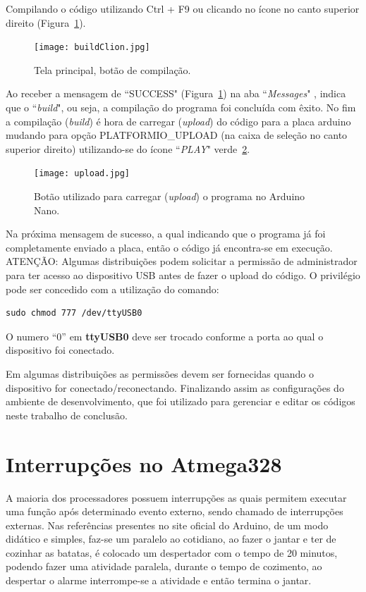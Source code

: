 \documentclass[a4paper,12pt,portuguese]{ufms-cpcx}
\begin{document}
Compilando o código utilizando Ctrl + F9 ou clicando no ícone no canto superior direito (Figura~\ref{fig:telarun1}).
\begin{figure}[H]	
	\centering
	\texttt{[image: buildClion.jpg]}
	\caption{Tela principal, botão de compilação.}
	\label{fig:telarun1}
\end{figure}
Ao receber a mensagem de ``SUCCESS" (Figura~\ref{fig:telarun1})  na aba ``\textit{Messages}" , indica que o ``\textit{build}", ou seja, a compilação do programa foi concluída com êxito.
No fim a compilação (\textit{build}) é hora de carregar (\textit{upload}) do código para a placa arduino mudando para opção PLATFORMIO\_UPLOAD (na caixa de seleção no canto superior direito) utilizando-se do ícone ``\textit{PLAY}" verde~\ref{fig:telaupload}.
\begin{figure}[H]	
	\centering
	\texttt{[image: upload.jpg]}
	\caption{Botão utilizado para carregar (\textit{upload}) o programa no Arduino Nano.}
	\label{fig:telaupload}
\end{figure}
Na próxima mensagem de sucesso, a qual indicando que o programa já foi completamente enviado a placa, então o código já encontra-se em execução.
ATENÇÃO: Algumas distribuições podem solicitar a permissão de administrador para ter acesso ao dispositivo USB antes de fazer o upload do código. O privilégio pode ser concedido com a utilização do comando:
\begin{lstlisting}
sudo chmod 777 /dev/ttyUSB0
\end{lstlisting}
O numero “0” em \textbf{ttyUSB0} deve ser trocado conforme a porta ao qual o dispositivo foi conectado.

Em algumas distribuições as permissões devem ser fornecidas quando o dispositivo for conectado/reconectando.
Finalizando assim as configurações do ambiente de desenvolvimento, que foi utilizado para gerenciar e editar os códigos neste trabalho de conclusão.

\chapter{Interrupções no Atmega328}

A maioria dos processadores possuem interrupções as quais permitem executar uma função após determinado evento externo, sendo chamado de interrupções externas. Nas referências presentes no site oficial do Arduino, de um modo didático e simples, faz-se um paralelo ao cotidiano, ao fazer o jantar e ter de cozinhar as batatas, é colocado um despertador com o tempo de 20 minutos, podendo fazer uma atividade paralela, durante o tempo de cozimento, ao despertar o alarme interrompe-se a atividade e então termina o jantar. 
\end{document}
